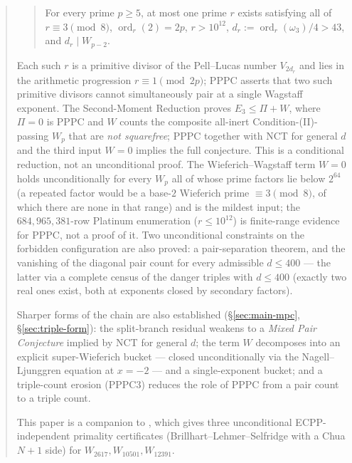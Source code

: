\documentclass[11pt]{amsart}
\theoremstyle{plain}
\theoremstyle{definition}
\theoremstyle{remark}
\numberwithin{equation}{section}
\newcommand{\ord}{\operatorname{ord}}
\begin{document}
\begin{abstract}
\begin{quote}
For every prime $p \geq 5$, at most one prime $r$ exists satisfying all of $r \equiv 3 \pmod 8$, $\ord_r(2) = 2p$, $r > 10^{12}$, $d_r := \ord_r(\omega_3)/4 > 43$, and $d_r \mid W_{p-2}$.
\end{quote}

Each such $r$ is a primitive divisor of the Pell--Lucas number $V_{2 d_r}$ and lies in the arithmetic progression $r \equiv 1 \pmod{2p}$; PPPC asserts that two such primitive divisors cannot simultaneously pair at a single Wagstaff exponent. The Second-Moment Reduction proves $E_3 \leq \Pi + W$, where $\Pi = 0$ is PPPC and $W$ counts the composite all-inert Condition-(II)-passing $W_p$ that are \emph{not squarefree}; PPPC together with NCT for general $d$ and the third input $W = 0$ implies the full conjecture. This is a conditional reduction, not an unconditional proof. The Wieferich--Wagstaff term $W = 0$ holds unconditionally for every $W_p$ all of whose prime factors lie below $2^{64}$ (a repeated factor would be a base-$2$ Wieferich prime $\equiv 3 \pmod 8$, of which there are none in that range) and is the mildest input; the $684{,}965{,}381$-row Platinum enumeration ($r \leq 10^{12}$) is finite-range evidence for PPPC, not a proof of it. Two unconditional constraints on the forbidden configuration are also proved: a pair-separation theorem, and the vanishing of the diagonal pair count for every admissible $d \leq 400$ --- the latter via a complete census of the danger triples with $d \leq 400$ (exactly two real ones exist, both at exponents closed by secondary factors).

Sharper forms of the chain are also established (\S\ref{sec:main-mpc}, \S\ref{sec:triple-form}): the split-branch residual weakens to a \emph{Mixed Pair Conjecture} implied by NCT for general $d$; the term $W$ decomposes into an explicit super-Wieferich bucket --- closed unconditionally via the Nagell--Ljunggren equation at $x = -2$ --- and a single-exponent bucket; and a triple-count erosion (PPPC3) reduces the role of PPPC from a pair count to a triple count.

This paper is a companion to \cite{ref:A}, which gives three unconditional ECPP-independent primality certificates (Brillhart--Lehmer--Selfridge with a Chua $N+1$ side) for $W_{2617}, W_{10501}, W_{12391}$.
\end{abstract}

\maketitle
\end{document}

